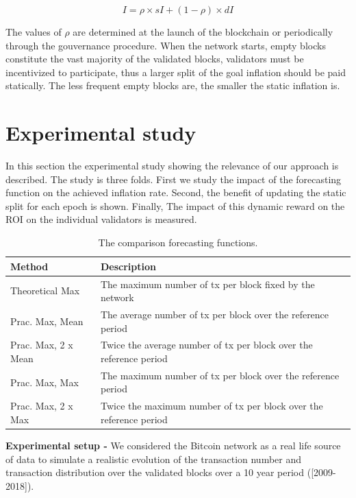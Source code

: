 \documentclass[]{article}
\begin{document}
\begin{equation}
    I=\rho \times sI + (1 - \rho) \times dI
    \label{eq:inflationsplitRho}
\end{equation}

The values of $\rho$ are determined at the launch of the blockchain or periodically through the gouvernance procedure. When the network starts, empty blocks constitute the vast majority of the validated blocks, validators must be incentivized to participate, thus a larger split of the goal inflation should be paid statically. The less frequent empty blocks are, the smaller the static inflation is.

\section{Experimental study}
\label{sec:experiements}
In this section the experimental study showing the relevance of our approach is described. The study is three folds. First we study the impact of the forecasting function on the achieved inflation rate. Second, the benefit of updating the static split for each epoch is shown. Finally, The impact of this dynamic reward on the ROI on the individual validators is measured.

\begin{table}[t]
	\centering
    \def\arraystretch{2}
	\caption{The comparison forecasting functions.}
	\begin{tabular}{|l|l|}
		\hline
		Method & Description \\
		\hline\hline
		Theoretical Max & The maximum number of tx per block fixed by the network\\
		\hline
		Prac. Max, Mean & The average number of tx per block over the reference period  \\
		\hline
		Prac. Max, 2 x Mean & Twice the average number of tx per block over the reference period \\
		\hline
		Prac. Max, Max & The maximum number of tx per block over the reference period \\
		\hline
		Prac. Max, 2 x Max & Twice the maximum number of tx per block over the reference period \\
		\hline
	\end{tabular}
\label{tab:forecast}
\end{table}

\textbf{Experimental setup -} We considered the Bitcoin network as a real life source of data to simulate a realistic evolution of the transaction number and transaction distribution over the validated blocks over a  10 year period ([2009-2018]).
\end{document}
